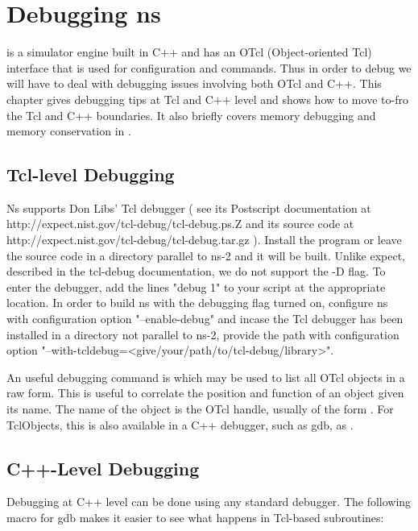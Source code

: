 \chapter{Debugging ns}
\label{sec:debug}

\ns is a simulator engine built in C++ and has an OTcl (Object-oriented
Tcl) interface that is used for configuration and commands. Thus in order
to debug \ns we will have to deal with debugging issues involving
both OTcl and C++. This chapter gives debugging tips at Tcl and C++
level and shows how to move to-fro the Tcl and C++ boundaries. It also
briefly covers memory debugging and memory conservation in \ns.


\section{Tcl-level Debugging}
\label{sec:tcldebug}

Ns supports Don Libs' Tcl debugger ( see its Postscript documentation at
http://expect.nist.gov/tcl-debug/tcl-debug.ps.Z and its source code at
http://expect.nist.gov/tcl-debug/tcl-debug.tar.gz ).
Install the program or leave the source code in a directory
parallel to ns-2 and it will be built. Unlike expect, described in the
tcl-debug documentation, we do not support the -D flag. To enter the
debugger, add the lines "debug 1" to your script at the appropriate
location. In order to build ns with the debugging flag turned on,
configure ns with configuration option "--enable-debug"
and incase the Tcl debugger has been installed in a directory not parallel
to ns-2, provide the path with configuration option 
"--with-tcldebug=<give/your/path/to/tcl-debug/library>".

An useful debugging command is  which may be used to 
list all OTcl objects in a raw form. This is useful to correlate the
position and function of an object given its name. The name of the object
is the OTcl handle, usually of the form . For TclObjects, this
is also available in a C++ debugger, such as gdb, as . 


\section{C++-Level Debugging}
\label{sec:cdebug}

Debugging at C++ level can be done using any standard debugger. The
following macro for gdb makes it easier to see what happens in Tcl-based
subroutines: 


